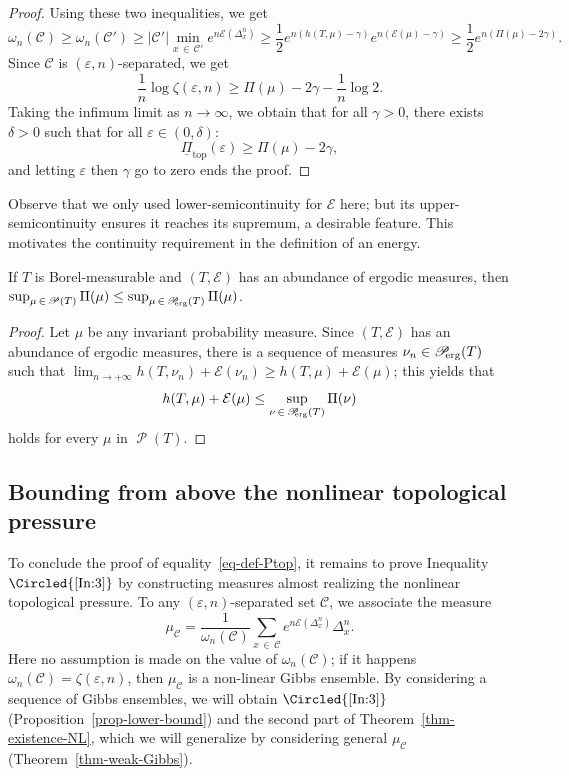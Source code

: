 \documentclass[10pt]{amsart}
\theoremstyle{definition}\newtheorem{defi}[theo]{Definition}\newtheorem{rema}[theo]{Remark}\newtheorem{exam}[theo]{Example}\newtheorem{exem}[theo]{Example}\newtheorem{nota}[theo]{Notation}
\theoremstyle{plain}
\theoremstyle{plain}
\newcommand\eps{\varepsilon}
\newcommand\NLP{\Pi}
\newcommand\Proberg{\Prob_{\kern-3pt\mathrm{erg}}}
\renewcommand\top{{\mathrm{top}}}
\newcommand\Prob{{\operatorname{\mathscr{P}}}}
\newcounter{In}
\newcommand{\Inref}[1]{\Circled{\ref{#1}}}
\newcommand*\8{\infty}
\newcommand{\ninf}{{n\to+\8}}
\newcommand{\En}{\mathcal{E}}
\newcommand{\cC}{\mathcal C}
\begin{document}
\begin{proof}
Using these two inequalities, we get
\[
\omega_n(\cC) \ge \omega_n(\cC') \ge \lvert \cC'\rvert \min_{x\,\in\,\cC'} e^{n\En\left(\Delta_x^n\right)} \ge \frac12 e^{n\left(h(T,\mu)-\gamma\right)} e^{n\left(\En(\mu)-\gamma\right)} \ge \frac12 e^{n\left(\NLP(\mu)-2\gamma\right)}.
\]
Since $\cC$ is $(\eps,n)$-separated, we get
\[
\frac1n \log\zeta(\eps,n) \ge \NLP(\mu)-2\gamma -\frac1n \log 2.
\]
Taking the infimum limit as $n\to\infty$, we obtain that for all $\gamma>0$, there exists $\delta>0$ such that for all $\varepsilon\in(0,\delta)$:
\[
\underline{\NLP}_{\top}(\varepsilon)\ge \NLP(\mu)-2\gamma,
\]
and letting $\eps$ then $\gamma$ go to zero ends the proof.
\end{proof}

Observe that we only used lower-semicontinuity for $\En$ here; but its upper-semicontin\-uity ensures it reaches its supremum, a desirable feature. This motivates the continuity requirement in the definition of an energy.



\begin{prop}[Inequality $\Inref{In:4}$]\label{prop-ine probproberg}
If $T$ is Borel-measurable and $(T,\En)$ has an abundance of ergodic measures, then $\sup_{\mu\,\in\,\Prob(T)} \NLP(\mu) \le\sup_{\mu\,\in\,\Proberg(T)} \NLP(\mu)$.
\end{prop}


\begin{proof}
Let $\mu$ be any invariant probability measure.
{Since} $(T,\En)$ has an abundance of ergodic measures, there is a sequence of measures $\nu_n\in\Proberg(T)$ such that { $\lim_{\ninf} h(T,\nu_n)+\En(\nu_n) \ge h(T,\mu)+\En(\mu)$}; this yields that
\[
h(T,\mu)+\En(\mu) \le \sup_{\nu\,\in\,\Proberg(T)} \NLP(\nu)
\]
holds for every $\mu$ in $\Prob(T)$.
\end{proof}



\subsection{Bounding from above the nonlinear topological pressure}\label{sec-Gibbs}

To conclude the proof of equality~\eqref{eq-def-Ptop}, it remains to prove Inequality $\Inref{In:3}$ by constructing measures almost realizing the nonlinear topological pressure. To any $(\varepsilon,n)$-separated set $\cC$, we associate the measure
\begin{equation}\label{eq-muC}
\mu_{\cC} = \frac{1}{\omega_{n}(\cC)} \sum_{x\,\in\,\cC} e^{n\En\left(\Delta_x^{n}\right)} \Delta_x^{n}.
\end{equation}
Here no assumption is made on the value of $\omega_{n}(\cC)$; if it happens $\omega_n(\cC)=\zeta(\varepsilon,n)$, then $\mu_{\cC}$ is a non-linear Gibbs ensemble. By considering a sequence of Gibbs ensembles, we will obtain $\Inref{In:3}$ (Proposition~\ref{prop-lower-bound}) and the second part of Theorem~\ref{thm-existence-NL}, which we will generalize by considering general $\mu_{\cC}$ (Theorem~\ref{thm-weak-Gibbs}).
\end{document}
